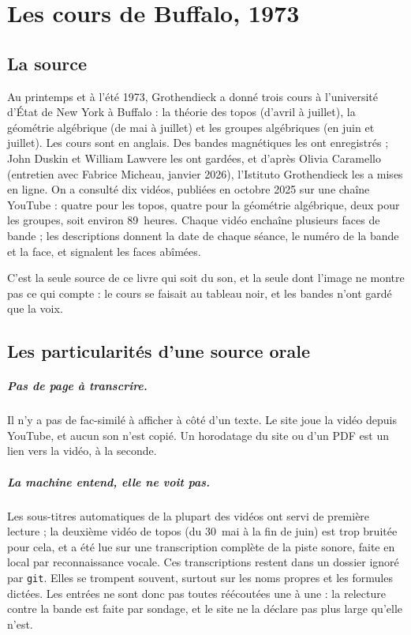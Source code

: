 \chapter{Les cours de Buffalo, 1973}\label{ch:buffalo}

\section{La source}

Au printemps et à l'été 1973, Grothendieck a donné trois cours à l'université d'État de
New York à Buffalo : la théorie des topos (d'avril à juillet), la géométrie algébrique (de
mai à juillet) et les groupes algébriques (en juin et juillet). Les cours sont en anglais.
Des bandes magnétiques les ont enregistrés ; John Duskin et William Lawvere les ont
gardées, et d'après Olivia Caramello (entretien avec Fabrice Micheau, janvier 2026),
l'Istituto Grothendieck les a mises en ligne. On a consulté dix vidéos, publiées en
octobre 2025 sur une chaîne YouTube : quatre pour les topos, quatre pour la géométrie
algébrique, deux pour les groupes, soit environ 89~heures. Chaque vidéo enchaîne plusieurs
faces de bande ; les descriptions donnent la date de chaque séance, le numéro de la bande et
la face, et signalent les faces abîmées.

C'est la seule source de ce livre qui soit du son, et la seule dont l'image ne montre pas
ce qui compte : le cours se faisait au tableau noir, et les bandes n'ont gardé que la voix.

\section{Les particularités d'une source orale}

\paragraph{Pas de page à transcrire.} Il n'y a pas de fac-similé à afficher à côté d'un
texte. Le site joue la vidéo depuis YouTube, et aucun son n'est copié. Un horodatage du
site ou d'un PDF est un lien vers la vidéo, à la seconde.

\paragraph{La machine entend, elle ne voit pas.} Les sous-titres automatiques de la plupart
des vidéos ont servi de première lecture ; la deuxième vidéo de topos (du 30~mai à la fin de
juin) est trop bruitée pour cela, et a été lue sur une transcription complète de la piste
sonore, faite en local par reconnaissance vocale. Ces transcriptions restent dans un
dossier ignoré par \texttt{git}. Elles se trompent souvent, surtout sur les noms propres et
les formules dictées. Les entrées ne sont donc pas toutes réécoutées une à une : la
relecture contre la bande est faite par sondage, et le site ne la déclare pas plus large
qu'elle n'est.

